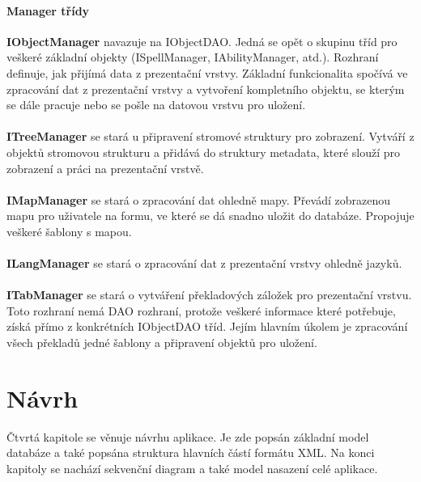 \documentclass[thesis=B,czech]{resources/FITthesis}[2012/06/26]
\begin{document}
\subsubsection*{Manager třídy}
\textbf{IObjectManager} navazuje na IObjectDAO. Jedná se opět o skupinu tříd pro veškeré základní objekty (ISpellManager, IAbilityManager, atd.). Rozhraní definuje, jak přijímá data z prezentační vrstvy. Základní funkcionalita spočívá ve zpracování dat z prezentační vrstvy a vytvoření kompletního objektu, se kterým se dále pracuje nebo se pošle na datovou vrstvu pro uložení.\\
\\
\noindent\textbf{ITreeManager} se stará u připravení stromové struktury pro zobrazení. Vytváří z objektů stromovou strukturu a přidává do struktury metadata, které slouží pro zobrazení a práci na prezentační vrstvě.\\
\\
\textbf{IMapManager} se stará o zpracování dat ohledně mapy. Převádí zobrazenou mapu pro uživatele na formu, ve které se dá snadno uložit do databáze. Propojuje veškeré šablony s mapou.\\
\\
\textbf{ILangManager} se stará o zpracování dat z prezentační vrstvy ohledně jazyků.\\
\\
\textbf{ITabManager} se stará o vytváření překladových záložek pro prezentační vrstvu. Toto rozhraní nemá DAO rozhraní, protože veškeré informace které potřebuje, získá přímo z konkrétních IObjectDAO tříd. Jejím hlavním úkolem je zpracování všech překladů jedné šablony a připravení objektů pro uložení.\\





\chapter{Návrh}
Čtvrtá kapitole se věnuje návrhu aplikace. Je zde popsán základní model databáze a také popsána struktura hlavních částí formátu XML. Na konci kapitoly se nachází sekvenční diagram a také model nasazení celé aplikace. 
\end{document}
